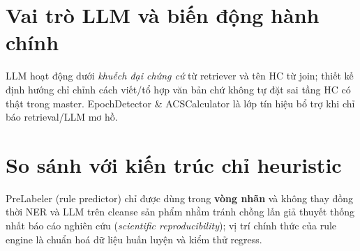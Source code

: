 \section{Vai trò LLM và biến động hành chính}
LLM hoạt động dưới \emph{khuếch đại chứng cứ} từ retriever và tên HC từ join; thiết kế định hướng chỉ chỉnh cách viết/tổ hợp văn bản chứ không tự đặt sai tầng HC có thật trong master. EpochDetector \& ACSCalculator là lớp tín hiệu bổ trợ khi chỉ báo retrieval/LLM mơ hồ.

\section{So sánh với kiến trúc chỉ heuristic}
PreLabeler (rule predictor) chỉ được dùng trong \textbf{vòng nhãn} và không thay đồng thời NER và LLM trên cleanse sản phẩm nhằm tránh chồng lấn giả thuyết thống nhất báo cáo nghiên cứu (\emph{scientific reproducibility}); vị trí chính thức của rule engine là chuẩn hoá dữ liệu huấn luyện và kiểm thử regress.
